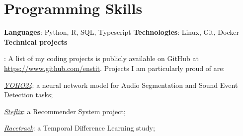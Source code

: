 \documentclass[a4paper,10pt,english]{article} %
\makeatletter
\newcommand{\resumeSubheading}[4]{
  \vspace{2pt}\item
    \begin{tabular*}{0.97\textwidth}{l@{\extracolsep{\fill}}r}
      \textbf{#1} & \textit{\small #2} \\
      #3 & \small #4 \\
    \end{tabular*}\vspace{5pt}\\
}
\makeatother
\begin{document}
\begin{itemize}[leftmargin=*]
	\vspace{0.5em}

\end{itemize}

\section{Programming Skills}
\textbf{Languages}{: Python, R, SQL, Typescript}
\hfill
\textbf{Technologies}{: Linux, Git, Docker}
\vspace{0.5em}
\\
\textbf{Technical projects}{: A list of my coding projects is publicly available on GitHub at \url{https://www.github.com/enstit}. Projects I am particularly proud of are:
	\begin{itemize*}[label=$\Diamond$]
		\item \href{https://www.github.com/enstit/YOHO24}{\textit{YOHO24}}: a neural network model for Audio Segmentation and Sound Event Detection tasks;
		\item \href{https://www.github.com/enstit/Steflix}{\textit{Steflix}}: a Recommender System project;
		\item \href{https://www.github.com/enstit/Racetrack}{\textit{Racetrack}}: a Temporal Difference Learning study;
	\end{itemize*}
}
\end{document}
